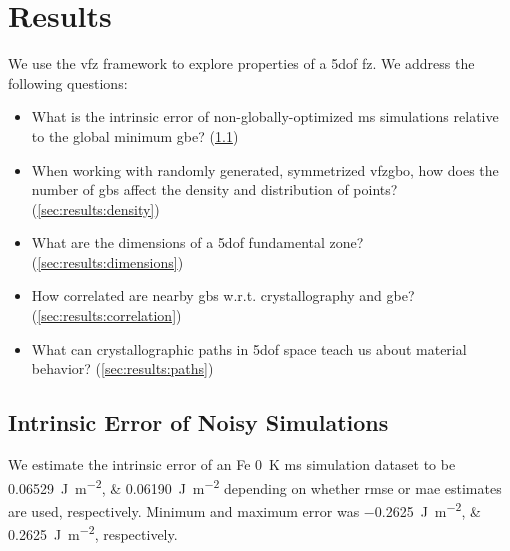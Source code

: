 \documentclass[final,twocolumn,12pt]{elsarticle}
\begin{document}
	
	\section{Results} \label{sec:results}
	
	We use the \gls{vfz} framework to explore properties of a \gls{5dof} \gls{fz}. We address the following questions:
	\begin{itemize}
		\item What is the intrinsic error of non-globally-optimized \gls{ms} simulations relative to the global minimum \gls{gbe}? (\cref{sec:results:error})
		\item When working with randomly generated, symmetrized \gls{vfzgbo}, how does the number of \glspl{gb} affect the density and distribution of points? (\cref{sec:results:density})
		\item What are the dimensions of a \gls{5dof} fundamental zone? (\cref{sec:results:dimensions})
		\item How correlated are nearby \glspl{gb} w.r.t. crystallography and \gls{gbe}? (\cref{sec:results:correlation})
		\item What can crystallographic paths in \gls{5dof} space teach us about material behavior? (\cref{sec:results:paths})
	\end{itemize}
	
	
	\subsection{Intrinsic Error of Noisy  Simulations} \label{sec:results:error}
	We estimate the intrinsic error of an Fe \SI{0}{\kelvin} \gls{ms} simulation dataset to be \SIlist{0.06529;0.06190}{\joule\per\square\meter} depending on whether \gls{rmse} or \gls{mae} estimates are used, respectively. Minimum and maximum error was \SIlist{-0.2625;0.2625}{\joule\per\square\meter}, respectively. 
	
\end{document}
